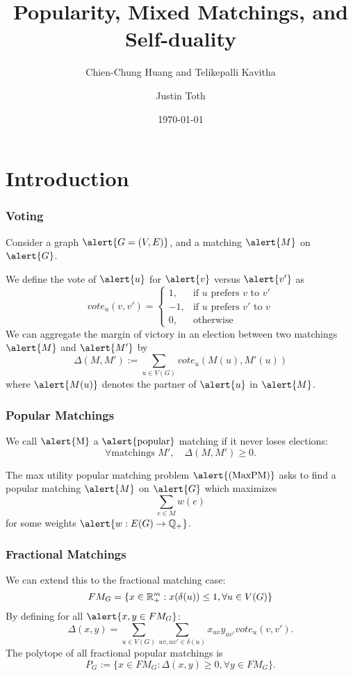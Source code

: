 \documentclass[10pt]{beamer}
\title{Popularity, Mixed Matchings, and Self-duality}
\subtitle{Chien-Chung Huang and Telikepalli Kavitha}
\date{\today}
\author{Justin Toth}
\institute{University of Waterloo}
\newcommand{\Q}{\mathbb{Q}}
\begin{document}
\maketitle

\section{Introduction}

\begin{frame}
\frametitle{Voting}
Consider a graph $\alert{G = (V,E)}$, and a matching $\alert{M}$ on $\alert{G}$.

We define the vote of $\alert{u}$ for $\alert{v}$ versus $\alert{v'}$ as
$$vote_u(v,v') = \begin{cases}
1, &\text{if $u$ prefers $v$ to $v'$} \\
-1, &\text{if $u$ prefers $v'$ to $v$} \\
0, &\text{otherwise}
\end{cases}
$$
We can aggregate the margin of victory in an election between two matchings $\alert{M}$ and $\alert{M'}$ by
$$\Delta(M,M') := \sum_{u \in V(G)} vote_u(M(u), M'(u)) $$
where $\alert{M(u)}$ denotes the partner of $\alert{u}$ in $\alert{M}$.
\end{frame}

\begin{frame}
\frametitle{Popular Matchings}
We call $\text{\alert{M}}$ a $\text{\alert{popular}}$ matching if it never loses elections:
$$\forall \text{matchings } M', \quad \Delta(M,M') \geq 0.$$


The max utility popular matching problem $\alert{\text{(MaxPM)}}$ asks to find a popular matching $\alert{M}$ on $\alert{G}$ which maximizes
$$\sum_{e\in M} w(e)$$
for some weights $\alert{ w: E(G) \rightarrow \Q_+}$.
\end{frame}

\begin{frame}
\frametitle{Fractional Matchings}
We can extend this to the fractional matching case:
$$FM_{G} = \{x \in \mathbb{R}^m_+ : x(\delta(u)) \leq 1, \forall u \in V(G)\}$$
By defining for all $\alert{x, y \in FM_{G}}$:
$$\Delta(x,y) = \sum_{u \in V(G)} \sum_{uv, uv' \in \delta(u)} x_{uv}y_{uv'} vote_u(v,v').$$
The polytope of all fractional popular matchings is 
$$P_G := \{x \in FM_{G}: \Delta(x,y) \geq 0, \forall y \in FM_G\}.$$
\end{frame}
\end{document}
